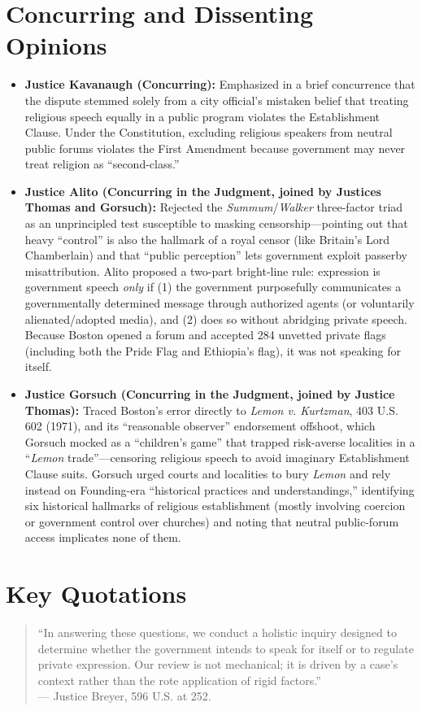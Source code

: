 \documentclass[12pt]{article}
\begin{document}
\section{Concurring and Dissenting Opinions}
\begin{itemize}
  \item \textbf{Justice Kavanaugh (Concurring):} Emphasized in a brief concurrence that the dispute stemmed solely from a city official's mistaken belief that treating religious speech equally in a public program violates the Establishment Clause. Under the Constitution, excluding religious speakers from neutral public forums violates the First Amendment because government may never treat religion as ``second-class.''
  \item \textbf{Justice Alito (Concurring in the Judgment, joined by Justices Thomas and Gorsuch):} Rejected the \textit{Summum}/\textit{Walker} three-factor triad as an unprincipled test susceptible to masking censorship---pointing out that heavy ``control'' is also the hallmark of a royal censor (like Britain's Lord Chamberlain) and that ``public perception'' lets government exploit passerby misattribution. Alito proposed a two-part bright-line rule: expression is government speech \emph{only} if (1) the government purposefully communicates a governmentally determined message through authorized agents (or voluntarily alienated/adopted media), and (2) does so without abridging private speech. Because Boston opened a forum and accepted 284 unvetted private flags (including both the Pride Flag and Ethiopia's flag), it was not speaking for itself.
  \item \textbf{Justice Gorsuch (Concurring in the Judgment, joined by Justice Thomas):} Traced Boston's error directly to \textit{Lemon v. Kurtzman}, 403 U.S. 602 (1971), and its ``reasonable observer'' endorsement offshoot, which Gorsuch mocked as a ``children's game'' that trapped risk-averse localities in a ``\textit{Lemon} trade''---censoring religious speech to avoid imaginary Establishment Clause suits. Gorsuch urged courts and localities to bury \textit{Lemon} and rely instead on Founding-era ``historical practices and understandings,'' identifying six historical hallmarks of religious establishment (mostly involving coercion or government control over churches) and noting that neutral public-forum access implicates none of them.
\end{itemize}

\section{Key Quotations}
\begin{quote}
``In answering these questions, we conduct a holistic inquiry designed to determine whether the government intends to speak for itself or to regulate private expression. Our review is not mechanical; it is driven by a case's context rather than the rote application of rigid factors.'' \\
--- Justice Breyer, 596 U.S. at 252.
\end{quote}
\end{document}

